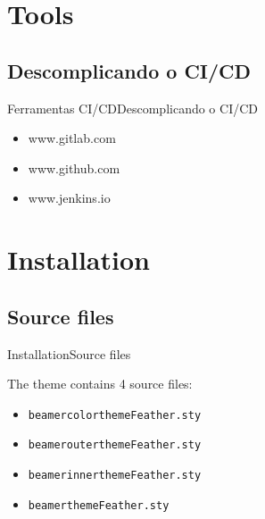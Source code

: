 \documentclass[10pt]{beamer}
\begin{document}
\section{Tools}
\subsection{Descomplicando o CI/CD}
\begin{frame}{Ferramentas CI/CD}{Descomplicando o CI/CD}
    \begin{itemize}
     \item www.gitlab.com
     \item www.github.com
     \item www.jenkins.io
    \end{itemize}
\end{frame}

\section{Installation}
\subsection{Source files}
\begin{frame}{Installation}{Source files}

\begin{block}{}
The theme contains 4 source files:
  \begin{itemize}
    \item {\tt beamercolorthemeFeather.sty}
    \item {\tt beamerouterthemeFeather.sty}
    \item {\tt beamerinnerthemeFeather.sty}
    \item {\tt beamerthemeFeather.sty}
  \end{itemize}
\end{block}
\end{frame}

\end{document}
